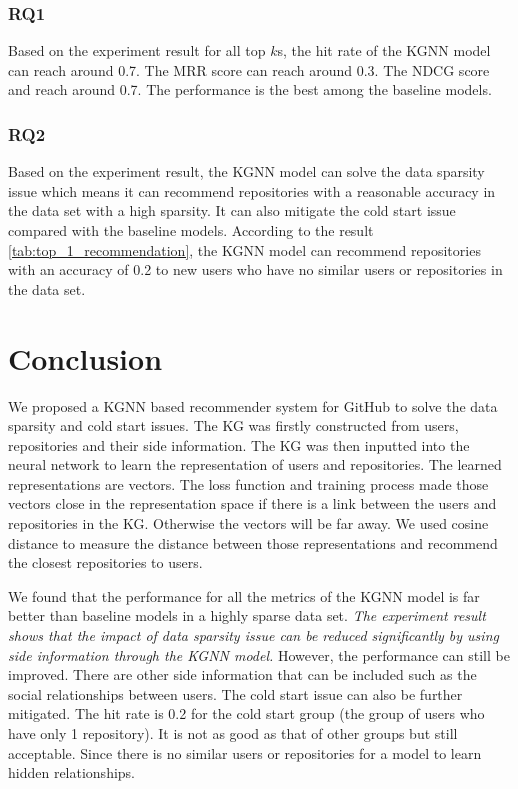 \documentclass[11pt,twoside]{report}
\begin{document}
\subsection{RQ1}
Based on the experiment result for all top $k$s, the hit rate of the KGNN model can reach around 0.7. The MRR score can reach around 0.3. The NDCG score and reach around 0.7. The performance is the best among the baseline models.

\subsection{RQ2}
Based on the experiment result, the KGNN model can solve the data sparsity issue which means it can recommend repositories with a reasonable accuracy in the data set with a high sparsity. It can also mitigate the cold start issue compared with the baseline models. According to the result \ref{tab:top_1_recommendation}, the KGNN model can recommend repositories with an accuracy of 0.2 to new users who have no similar users or repositories in the data set.

\chapter{Conclusion}
We proposed a KGNN based recommender system for GitHub to solve the data sparsity and cold start issues. The KG was firstly constructed from users, repositories and their side information. The KG was then inputted into the neural network to learn the representation of users and repositories. The learned representations are vectors. The loss function and training process made those vectors close in the representation space if there is a link between the users and repositories in the KG. Otherwise the vectors will be far away. We used cosine distance to measure the distance between those representations and recommend the closest repositories to users.

We found that the performance for all the metrics of the KGNN model is far better than baseline models in a highly sparse data set. \textit{The experiment result shows that the impact of data sparsity issue can be reduced significantly by using side information through the KGNN model.} However, the performance can still be improved. There are other side information that can be included such as the social relationships between users. The cold start issue can also be further mitigated. The hit rate is 0.2 for the cold start group (the group of users who have only 1 repository). It is not as good as that of other groups but still acceptable. Since there is no similar users or repositories for a model to learn hidden relationships.
\end{document}
